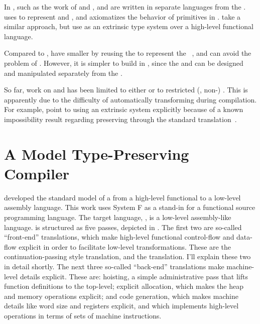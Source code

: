 In , such as the work of
\citet{necula1997} and \citet{necula1998},  and
 are written in separate languages from the
.
\citet{necula1997} uses  to represent  and
, and axiomatizes the behavior of  primitives
in  .
\citet{shao2005} take a similar approach, but use  as an extrinsic
type system over a high-level functional language.

Compared to ,  have smaller  by reusing the
 to represent the ~\cite{xi2001}, and can
avoid the problem of .
However, it is simpler to build  in
, since the  and
 can be designed and manipulated separately from the
.

So far, work on  and  has been limited to
either  or to restricted (\ie, non-)
.
This is apparently due to the difficulty of automatically transforming
 during compilation.
For example, \citet{shao2005} point to using an extrinsic system explicitly
because of a known impossibility result regarding preserving  through the standard  translation~\cite{barthe2002}.

\section{A Model Type-Preserving Compiler}
 developed the standard model of a 
 from a high-level functional to a low-level assembly language.
This work uses System F as a stand-in for a functional source programming language.
The target language, , is a low-level assembly-like language.
 is structured as five passes, depicted in
.
The first two are so-called ``front-end'' translations, which make high-level
functional control-flow and data-flow explicit in order to facilitate low-level
transformations.
These are the continuation-passing style  translation, and the
 translation.
I'll explain these two in detail shortly.
The next three so-called ``back-end'' translations make machine-level details
explicit.
These are: hoisting, a simple administrative pass that lifts function
definitions to the top-level; explicit allocation, which makes the heap and memory
operations explicit; and code generation, which makes machine details like
word size and registers explicit, and which implements high-level operations in
terms of sets of machine instructions.
\FigModelDigram

